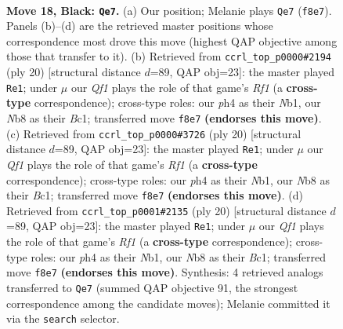 \documentclass[11pt]{article}
\begin{document}
\clearpage

\begin{figure}[p]\centering
\begin{subfigure}{0.46\textwidth}\centering
\resizebox{\linewidth}{!}{%
\newchessgame
\chessboard[
  setfen={rnb1rqk1/pp3pb1/4pnp1/1Q1p3p/P2P3P/1B3NP1/RPP2P1K/1NB1R3 b - - 0 18},
  showmover=false,
  pgfstyle=straightmove, color=movearrow, markmove={f8-e7}
]}
\caption{}
\end{subfigure}\hfill
\begin{subfigure}{0.46\textwidth}\centering
\resizebox{\linewidth}{!}{%
\newchessgame
\chessboard[
  setfen={r3kb1r/pp2pppp/1nnq4/7b/2p5/2P2N1P/PPBP1PP1/RNBQ1RK1 w kq - 1 11},
  showmover=false,
  pgfstyle=straightmove, color=movearrow, markmove={f1-e1}
]}
\caption{}
\end{subfigure}
\\[4pt]
\begin{subfigure}{0.46\textwidth}\centering
\resizebox{\linewidth}{!}{%
\newchessgame
\chessboard[
  setfen={r3kb1r/pp2pppp/1nnq4/7b/2p5/2P2N1P/PPBP1PP1/RNBQ1RK1 w kq - 1 11},
  showmover=false,
  pgfstyle=straightmove, color=movearrow, markmove={f1-e1}
]}
\caption{}
\end{subfigure}\hfill
\begin{subfigure}{0.46\textwidth}\centering
\resizebox{\linewidth}{!}{%
\newchessgame
\chessboard[
  setfen={r3kb1r/pp2pppp/1nnq4/7b/2p5/2P2N1P/PPBP1PP1/RNBQ1RK1 w kq - 1 11},
  showmover=false,
  pgfstyle=straightmove, color=movearrow, markmove={f1-e1}
]}
\caption{}
\end{subfigure}
\caption{\textbf{Move 18, Black: \texttt{Qe7}.} (a) Our position; Melanie plays \texttt{Qe7} (\texttt{f8e7}). Panels (b)--(d) are the retrieved master positions whose correspondence most drove this move (highest QAP objective among those that transfer to it). (b) Retrieved from \texttt{ccrl\_top\_p0000\#2194} (ply 20) [structural distance $d$=89, QAP obj=23]: the master played \texttt{Re1}; under $\mu$ our \emph{Qf1} plays the role of that game's \emph{Rf1} (a \textbf{cross-type} correspondence); cross-type roles: our \emph{p}h4 as their \emph{N}b1, our \emph{N}b8 as their \emph{B}c1; transferred move \texttt{f8e7} \textbf{(endorses this move)}. (c) Retrieved from \texttt{ccrl\_top\_p0000\#3726} (ply 20) [structural distance $d$=89, QAP obj=23]: the master played \texttt{Re1}; under $\mu$ our \emph{Qf1} plays the role of that game's \emph{Rf1} (a \textbf{cross-type} correspondence); cross-type roles: our \emph{p}h4 as their \emph{N}b1, our \emph{N}b8 as their \emph{B}c1; transferred move \texttt{f8e7} \textbf{(endorses this move)}. (d) Retrieved from \texttt{ccrl\_top\_p0001\#2135} (ply 20) [structural distance $d$=89, QAP obj=23]: the master played \texttt{Re1}; under $\mu$ our \emph{Qf1} plays the role of that game's \emph{Rf1} (a \textbf{cross-type} correspondence); cross-type roles: our \emph{p}h4 as their \emph{N}b1, our \emph{N}b8 as their \emph{B}c1; transferred move \texttt{f8e7} \textbf{(endorses this move)}. Synthesis: 4 retrieved analogs transferred to \texttt{Qe7} (summed QAP objective 91, the strongest correspondence among the candidate moves); Melanie committed it via the \texttt{search} selector.}
\label{fig:thought-m35}
\end{figure}
\end{document}
